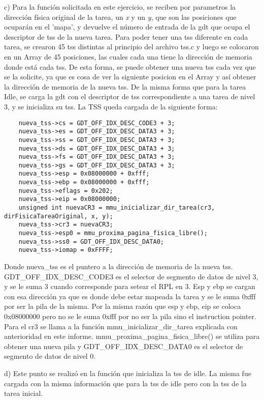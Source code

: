 \documentclass[a4paper]{article}
\begin{document}
c) Para la función solicitada en este ejercicio, se reciben por parametros la dirección física original de la tarea, un \textit{x} y un \textit{y}, que son las posiciones que ocuparán
en el 'mapa', y devuelve el número de entrada de la gdt que ocupa el descriptor de tss de la nueva tarea.
Para poder tener una tss diferente en cada tarea, se crearon 45 tss distintas al principio del archivo tss.c y luego se colocaron en un Array de 45 posiciones, las cuales cada una tiene
la dirección de memoria donde está cada tss. De esta forma, se puede obtener una nueva tss cada vez que se la solicite, ya que es cosa de ver la siguiente posicion en el Array y así obtener la dirección
de memoria de la nueva tss.
De la misma forma que para la tarea Idle, se carga la gdt con el descriptor de tss correspondiente a una tarea de nivel 3, y se inicializa su tss. La TSS queda cargada de la siguiente forma:
\begin{verbatim}
	nueva_tss->cs = GDT_OFF_IDX_DESC_CODE3 + 3;
	nueva_tss->es = GDT_OFF_IDX_DESC_DATA3 + 3;
	nueva_tss->ss = GDT_OFF_IDX_DESC_DATA3 + 3;
	nueva_tss->ds = GDT_OFF_IDX_DESC_DATA3 + 3;
	nueva_tss->fs = GDT_OFF_IDX_DESC_DATA3 + 3;
	nueva_tss->gs = GDT_OFF_IDX_DESC_DATA3 + 3;
	nueva_tss->esp = 0x08000000 + 0xfff;
	nueva_tss->ebp = 0x08000000 + 0xfff;
	nueva_tss->eflags = 0x202;
	nueva_tss->eip = 0x08000000;
	unsigned int nuevaCR3 = mmu_inicializar_dir_tarea(cr3, dirFisicaTareaOriginal, x, y);
	nueva_tss->cr3 = nuevaCR3;
	nueva_tss->esp0 = mmu_proxima_pagina_fisica_libre();
	nueva_tss->ss0 = GDT_OFF_IDX_DESC_DATA0;
	nueva_tss->iomap = 0xFFFF;
\end{verbatim}
Donde nueva_tss es el puntero a la dirección de memoria de la nueva tss. GDT_OFF_IDX_DESC_CODE3 es el selector de segmento de datos de nivel 3, y se le suma 3 cuando corresponde
para setear el RPL en 3. Esp y ebp se cargan con esa dirección ya que es donde debe estar mapeada la tarea y se le suma 0xfff por ser la pila de la misma. Por la misma razón que esp y ebp, eip se coloca 0x08000000
pero no se le suma 0xfff por no ser la pila sino el instruction pointer. Para el cr3 se llama a la función mmu_inicializar_dir_tarea explicada con anterioridad en este informe.
mmu_proxima_pagina_fisica_libre() se utiliza para obtener una nueva pila y GDT_OFF_IDX_DESC_DATA0 es el selector de segmento de datos de nivel 0.

d) Este punto se realizó en la función que inicializa la tss de idle. La misma fue cargada con la misma información que para la tss de idle pero con la tss de la tarea inicial.
\end{document}
